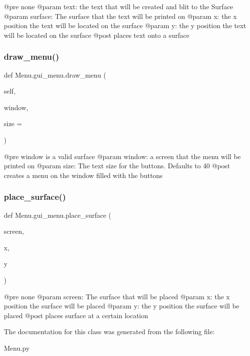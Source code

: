 \begin{DoxyVerb}@pre none
@param text: the text that will be created and blit to the Surface
@param surface: The surface that the text will be printed on
@param x: the x position the text will be located on the surface
@param y: the y position the text will be located on the surface
@post places text onto a surface
\end{DoxyVerb}
 \mbox{\label{class_menu_1_1gui__menu_a3d96db0e51b2161312b216e946513f53}} 
\subsubsection{\texorpdfstring{draw\+\_\+menu()}{draw\_menu()}}
{\footnotesize\ttfamily def Menu.\+gui\+\_\+menu.\+draw\+\_\+menu (\begin{DoxyParamCaption}\item[{}]{self,  }\item[{}]{window,  }\item[{}]{size = {} }\end{DoxyParamCaption})}

\begin{DoxyVerb}@pre window is a valid surface
@param window: a screen that the menu will be printed on
@param size: The text size for the buttons. Defaults to 40
@post creates a menu on the window filled with the buttons
\end{DoxyVerb}
 \mbox{\label{class_menu_1_1gui__menu_a13a81e60fa37eb7624bb08ce0c2a8706}} 
\subsubsection{\texorpdfstring{place\+\_\+surface()}{place\_surface()}}
{\footnotesize\ttfamily def Menu.\+gui\+\_\+menu.\+place\+\_\+surface (\begin{DoxyParamCaption}\item[{}]{screen,  }\item[{}]{x,  }\item[{}]{y }\end{DoxyParamCaption})}

\begin{DoxyVerb}@pre none
@param screen: The surface that will be placed
@param x: the x position the surface will be placed
@param y: the y position the surface will be placed
@post places surface at a certain location
\end{DoxyVerb}
 

The documentation for this class was generated from the following file\+:\begin{DoxyCompactItemize}
\item 
Menu.\+py\end{DoxyCompactItemize}
